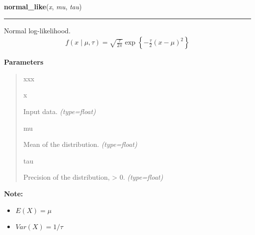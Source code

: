     \begin{boxedminipage}{\textwidth}

    \raggedright \textbf{normal\_like}(\textit{x}, \textit{mu}, \textit{tau})

    \vspace{-1.5ex}

    \rule{\textwidth}{0.5\fboxrule}

Normal log-likelihood.
\begin{equation*}\begin{split}f(x \mid \mu, \tau) = \sqrt{\frac{\tau}{2\pi}} \exp\left\{ -\frac{\tau}{2} (x-\mu)^2 \right\}\end{split}\end{equation*}    \vspace{1ex}

      \textbf{Parameters}
      \begin{quote}
        \begin{Ventry}{xxx}

          \item[x]


Input data.
            \textit{(type=float)}

          \item[mu]


Mean of the distribution.
            \textit{(type=float)}

          \item[tau]


Precision of the distribution, {\textgreater} 0.
            \textit{(type=float)}

        \end{Ventry}

      \end{quote}

    \vspace{1ex}

\textbf{Note:} \begin{itemize}
\item {} 
$E(X) = \mu$

\item {} 
$Var(X) = 1/\tau$

\end{itemize}


    \end{boxedminipage}

    \label{pymc:distributions:rpoisson}

